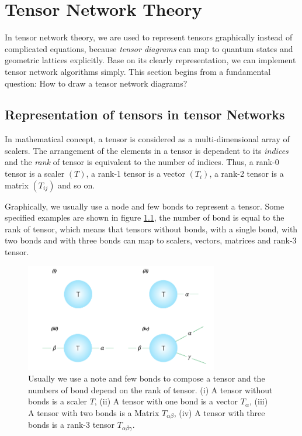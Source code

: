\chapter{Tensor Network Theory}
In tensor network theory, we are used to represent tensors graphically instead of complicated equations, because \textit{tensor diagrams} can map to quantum states and geometric lattices explicitly. Base on its clearly representation, we can implement tensor network algorithms simply. This section begins from a fundamental question: How to draw a tensor network diagrams?
\section{Representation of tensors in tensor Networks}
\label{notations}
In mathematical concept, a tensor is considered as a multi-dimensional array of scalers. The arrangement of the elements in a tensor is dependent to its \textit{indices} and the \textit{rank} of tensor is equivalent to the number of indices. Thus, a rank-0 tensor is a scaler $(T)$, a rank-1 tensor is a vector $(T_{i})$, a rank-2 tensor is a matrix $(T_{ij})$ and so on. 

Graphically, we usually use a node and few bonds to represent a tensor. Some specified examples are shown in figure \ref{fig211}, the number of bond is equal to the rank of tensor, which means that tensors without bonds, with a single bond, with two bonds and with three bonds can map to scalers, vectors, matrices and rank-3 tensor.

	\begin{figure}[ht]
	\centering
	\includegraphics[width=0.75\textwidth]{figures/fig211.png}
	\caption[The reprecentation of commen tensors.]{Usually we use a note and few bonds to compose a tensor and the numbers of bond depend on the rank of tensor. (i) A tensor without bonds is a scaler $T$, (ii) A tensor with one bond is a vector $T_{\alpha}$, (iii) A tensor with two bonds is a Matrix $T_{\alpha \beta}$, (iv) A tensor with three bonds is a rank-3 tensor $T_{\alpha \beta \gamma}$.}
	\label{fig211}
	\end{figure}


